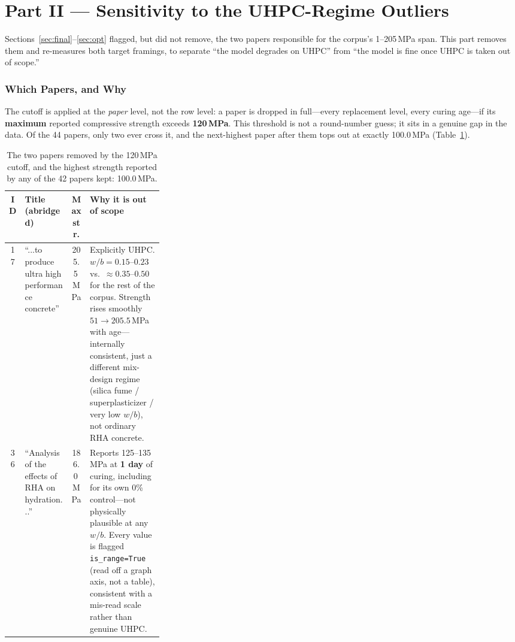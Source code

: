 \documentclass[11pt]{article}
\begin{document}

\part*{Part II --- Sensitivity to the UHPC-Regime Outliers}
\label{sec:part2}
Sections~\ref{sec:final}--\ref{sec:opt} flagged, but did not remove, the two papers
responsible for the corpus's 1--205\,MPa span. This part removes them and re-measures
both target framings, to separate ``the model degrades on UHPC'' from ``the model is
fine once UHPC is taken out of scope.''

\section{Which Papers, and Why}
\label{sec:part2-cutoff}
The cutoff is applied at the \emph{paper} level, not the row level: a paper is dropped
in full---every replacement level, every curing age---if its \textbf{maximum} reported
compressive strength exceeds \textbf{120\,MPa}. This threshold is not a round-number
guess; it sits in a genuine gap in the data. Of the 44 papers, only two ever cross it,
and the next-highest paper after them tops out at exactly 100.0\,MPa (Table~\ref{tab:cutoff}).
\begin{table}[H]\centering\small
\begin{tabularx}{\linewidth}{@{}c>{\raggedright\arraybackslash}p{0.3\linewidth}c>{\raggedright\arraybackslash}X@{}}
\toprule
ID & Title (abridged) & Max str. & Why it is out of scope \\
\midrule
17 & ``...to produce ultra high performance concrete'' & 205.5\,MPa &
  Explicitly UHPC. $w/b=0.15$--$0.23$ vs.\ $\approx0.35$--$0.50$ for the rest of the
  corpus. Strength rises smoothly $51\to205.5$\,MPa with age---internally
  consistent, just a different mix-design regime (silica fume / superplasticizer /
  very low $w/b$), not ordinary RHA concrete. \\[0.4em]
36 & ``Analysis of the effects of RHA on hydration...'' & 186.0\,MPa &
  Reports 125--135\,MPa at \textbf{1 day} of curing, including for its own 0\%
  control---not physically plausible at any $w/b$. Every value is flagged
  \texttt{is\_range=True} (read off a graph axis, not a table), consistent with a
  mis-read scale rather than genuine UHPC. \\
\bottomrule
\end{tabularx}
\caption{The two papers removed by the 120\,MPa cutoff, and the highest
strength reported by any of the 42 papers kept: 100.0\,MPa.}
\label{tab:cutoff}
\end{table}
\end{document}
